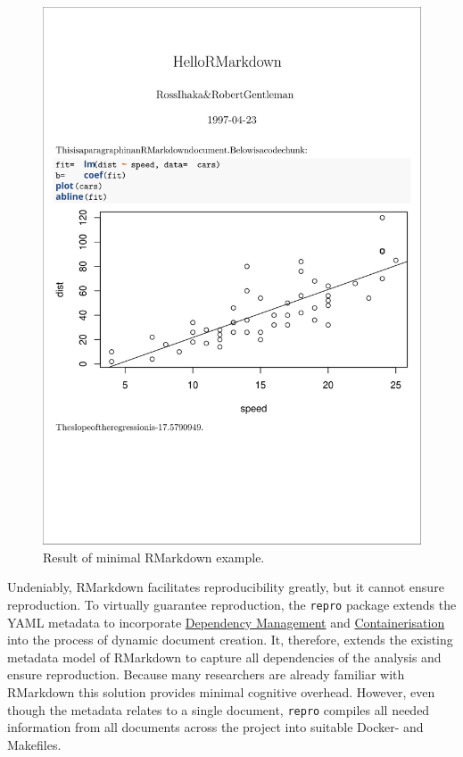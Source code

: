 \documentclass[12pt,a4paper,twoside]{article}
\begin{document}
\begin{figure}

{\centering \includegraphics[width=1\linewidth]{images/rmarkdown} 

}

\caption{Result of minimal RMarkdown example.}\label{fig:rmarkdown}
\end{figure}

Undeniably, RMarkdown facilitates reproducibility greatly, but it cannot ensure reproduction.
To virtually guarantee reproduction, the \texttt{repro} package extends the YAML metadata to incorporate \protect\hyperlink{dependency-management}{Dependency Management} and \protect\hyperlink{containerisation}{Containerisation} into the process of dynamic document creation.
It, therefore, extends the existing metadata model of RMarkdown to capture all dependencies of the analysis and ensure reproduction.
Because many researchers are already familiar with RMarkdown this solution provides minimal cognitive overhead.
However, even though the metadata relates to a single document, \texttt{repro} compiles all needed information from all documents across the project into suitable Docker- and Makefiles.
\end{document}
